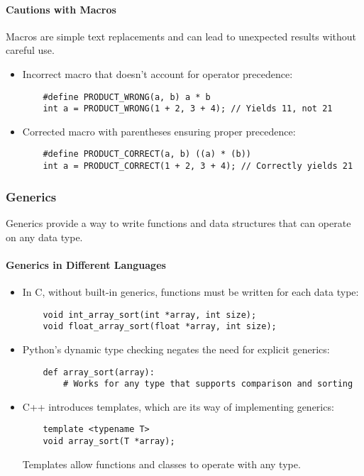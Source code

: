 \documentclass[12pt]{article}
\begin{document}
\paragraph{Cautions with Macros}
Macros are simple text replacements and can lead to unexpected results without careful use.
\begin{itemize}
    \item Incorrect macro that doesn't account for operator precedence:
    \begin{lstlisting}
    #define PRODUCT_WRONG(a, b) a * b
    int a = PRODUCT_WRONG(1 + 2, 3 + 4); // Yields 11, not 21
    \end{lstlisting}
    
    \item Corrected macro with parentheses ensuring proper precedence:
    \begin{lstlisting}
    #define PRODUCT_CORRECT(a, b) ((a) * (b))
    int a = PRODUCT_CORRECT(1 + 2, 3 + 4); // Correctly yields 21
    \end{lstlisting}
\end{itemize}

\subsubsection{Generics}
Generics provide a way to write functions and data structures that can operate on any data type.

\paragraph{Generics in Different Languages}
\begin{itemize}
    \item In C, without built-in generics, functions must be written for each data type:
    \begin{lstlisting}
    void int_array_sort(int *array, int size);
    void float_array_sort(float *array, int size);
    \end{lstlisting}

    \item Python's dynamic type checking negates the need for explicit generics:
    \begin{lstlisting}
    def array_sort(array):
        # Works for any type that supports comparison and sorting
    \end{lstlisting}

    \item C++ introduces templates, which are its way of implementing generics:
    \begin{lstlisting}
    template <typename T>
    void array_sort(T *array);
    \end{lstlisting}
    Templates allow functions and classes to operate with any type.
\end{itemize}
\end{document}
